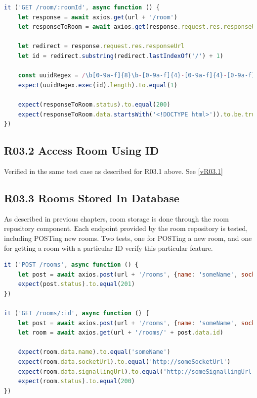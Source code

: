 \begin{lstlisting}[language=JavaScript]
it ('GET /room/:roomId', async function () {
    let response = await axios.get(url + '/room')
    let responseToRoom = await axios.get(response.request.res.responseUrl)

    let redirect = response.request.res.responseUrl
    let id = redirect.substring(redirect.lastIndexOf('/') + 1)

    const uuidRegex = /\b[0-9a-f]{8}\b-[0-9a-f]{4}-[0-9a-f]{4}-[0-9a-f]{4}-\b[0-9a-f]{12}\b/
    expect(uuidRegex.exec(id).length).to.equal(1)
    
    expect(responseToRoom.status).to.equal(200)
    expect(responseToRoom.data.startsWith('<!DOCTYPE html>')).to.be.true
})
\end{lstlisting}

\subsection{R03.2 Access Room Using ID}
\label{vR03.2}

Verified in the same test case as described for R03.1 above. See \ref{vR03.1}

\subsection{R03.3 Rooms Stored In Database}
\label{vR03.3}

As described in previous chapters, room storage is done through the room repository component. Each endpoint provided by the room repository is tested, including POSTing new rooms. Two tests, one for POSTing a new room, and one for getting a room with a particular ID verify this particular feature.

\begin{lstlisting}[language=JavaScript]
it ('POST /rooms', async function () {
    let post = await axios.post(url + '/rooms', {name: 'someName', socketUrl: 'http://someSocketUrl', signallingUrl: 'http://someSignallingUrl'})
    expect(post.status).to.equal(201)
})

it ('GET /rooms/:id', async function () {
    let post = await axios.post(url + '/rooms', {name: 'someName', socketUrl: 'http://someSocketUrl', signallingUrl: 'http://someSignallingUrl'})
    let room = await axios.get(url + '/rooms/' + post.data.id)

    éxpect(room.data.name).to.equal('someName')
    expect(room.data.socketUrl).to.equal('http://someSocketUrl')
    expect(room.data.signallingUrl).to.equal('http://someSignallingUrl')
    expect(room.status).to.equal(200)
})
\end{lstlisting}

